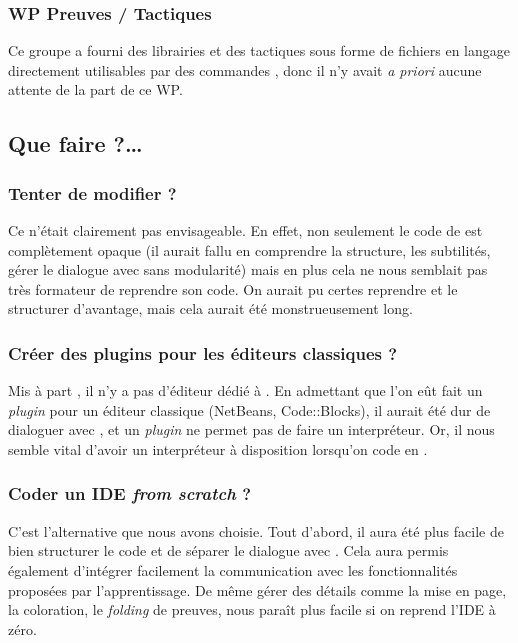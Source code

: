 		\subsubsection{WP Preuves / Tactiques}
			Ce groupe a fourni des librairies et des tactiques sous forme de fichiers en langage \coq{} directement utilisables par des commandes \coq{}, donc il n'y avait \emph{a priori} aucune attente de la part de ce WP.

    \subsection{Que faire ?…}

        \subsubsection{Tenter de modifier \coqide{} ?}

            Ce n'était clairement pas envisageable.
            En effet, non seulement le code de \coqide{} est complètement opaque (il aurait fallu en comprendre la structure, les subtilités, gérer le dialogue avec \coq{} sans modularité) mais en plus cela ne nous semblait pas très formateur de reprendre son code.
            On aurait pu certes reprendre \coqide{} et le structurer d'avantage, mais cela aurait été monstrueusement long.
			
        \subsubsection{Créer des plugins pour les éditeurs classiques ?}

			Mis à part \coqide{}, il n'y a pas d'éditeur dédié à \coq{}. En admettant que l'on eût fait un \emph{plugin} pour un éditeur classique (NetBeans, Code\string:\string:Blocks), il aurait été dur de dialoguer avec \coqtop{}, et un \emph{plugin} ne permet pas de faire un interpréteur. Or, il nous semble vital d'avoir un interpréteur à disposition lorsqu'on code en \coq{}.
			
        \subsubsection{Coder un IDE \textit{from scratch} ?}
        
			C'est l'alternative que nous avons choisie. 
			Tout d'abord, il aura été plus facile de bien structurer le code et de séparer le dialogue avec \coq{}.
			Cela aura permis également d'intégrer facilement la communication avec les fonctionnalités proposées par l'apprentissage.
			De même gérer des détails comme la mise en page, la coloration, le \emph{folding} de preuves, nous paraît plus facile si on reprend l'IDE à zéro.
			
